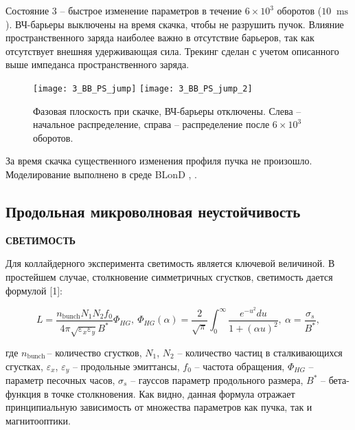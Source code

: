 \par Состояние 3 – быстрое изменение параметров в течение $6\times{10}^3$ о\-бо\-ро\-тов ($10~\text{ ms}$). ВЧ-барьеры выключены на время скачка, чтобы не разрушить пучок. Влияние пространственного заряда наиболее важно в отсутствие барь\-е\-ров, так как отсутствует внешняя удерживающая сила. Трекинг сделан с учетом описанного выше импеданса пространственного заряда.

\begin{figure}[!h]
   \texttt{[image: 3\_BB\_PS\_jump]}
   \texttt{[image: 3\_BB\_PS\_jump\_2]}
   \caption{Фазовая плоскость при скачке, ВЧ-барьеры отключены. Слева – начальное распределение, справа – распределение после $6\times{10}^3$ оборотов.}
   \label{fig:3}
\end{figure}

\par За время скачка существенного изменения профиля пучка не про\-и\-зош\-ло. Моделирование выполнено в среде BLonD \cite{blond1}, \cite{blond}.


\subsection{Продольная микроволновая неустойчивость}\label{sec:transition_jump/microwave_instab}

\textbf{СВЕТИМОСТЬ}

\par Для коллайдерного эксперимента светимость является ключевой величиной. В простейшем случае, столкновение симметричных сгустков, светимость дается формулой [1]:

\begin{equation}
L=\frac{n_{\mathrm{bunch}}N_1N_2f_0}{4\pi\sqrt{\varepsilon_x\varepsilon_y}B^\ast}\Phi_{HG}, \
\Phi_{HG}(\alpha)=\frac{2}{\sqrt\pi}\int_{0}^{\infty}\frac{e^{-u^2}du}{1+(\alpha u)^2},\
\alpha=\frac{\sigma_s}{B^\ast},
\label{eq:luminocity}
\end{equation}

\noindent где $n_{\mathrm{bunch\ }}$– количество сгустков, $N_1$, $N_2$ – количество частиц в сталкивающихся сгустках, $\varepsilon_x$, $\varepsilon_y$ – продольные эмиттансы, $f_0$ – частота обращения, $\Phi_{HG}$ – параметр песочных часов, $\sigma_s$ – гауссов параметр продольного размера, $B^\ast$ – бета-функция в точке столкновения. Как видно, данная формула отражает принципиальную зависимость от множества параметров как пучка, так и магнитооптики.

